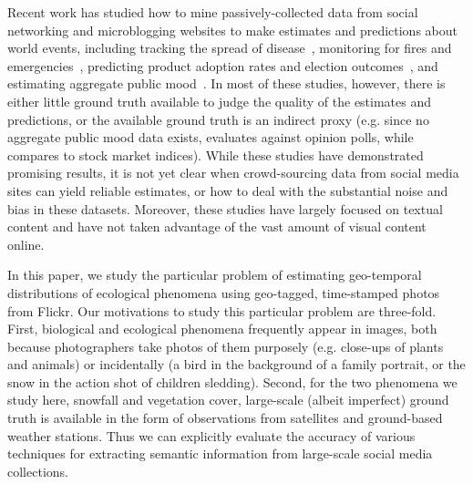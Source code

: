 Recent work has studied how to mine passively-collected data
from social networking and microblogging websites to make estimates
and predictions about world events, including tracking the spread of
disease~\cite{ginsberg09flu}, monitoring for fires and
emergencies~\cite{delongueville09}, predicting product adoption rates
and election outcomes~\cite{jin10prediction}, and estimating aggregate
public mood~\cite{oconnor10mood,bollen11twitter}. In most of these
studies, however, there is either little ground truth available to
judge the quality of the estimates and predictions, or the available
ground truth is an indirect proxy (e.g. since no aggregate public mood
data exists, \cite{oconnor10mood} evaluates against opinion polls,
while~\cite{bollen11twitter} compares to stock market indices).  While
these studies have demonstrated promising results, it is not yet clear
when crowd-sourcing data from social media sites can yield reliable
estimates, or how to deal with the substantial noise and bias in these
datasets. Moreover, these studies have largely focused on textual
content and have not taken advantage of the vast amount of visual
content online.

In this paper, we study the particular problem of estimating
geo-temporal distributions of ecological phenomena using geo-tagged,
time-stamped photos from Flickr.  Our motivations to study this
particular problem are three-fold.  First, biological and ecological
phenomena frequently appear in images, both because photographers take
photos of them purposely (e.g. close-ups of plants and animals) or
incidentally (a bird in the background of a family portrait, or the
snow in the action shot of children sledding).  Second, for the two
phenomena we study here, snowfall and vegetation cover, large-scale
(albeit imperfect) ground truth is available in the form of
observations from satellites and ground-based weather stations.  Thus
we can explicitly evaluate the accuracy of various techniques for
extracting semantic information from large-scale social media
collections.


